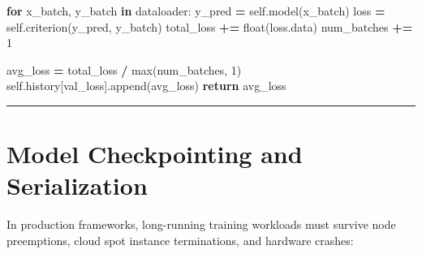 \documentclass[
  letterpaper,
]{scrbook}
\newenvironment{Shaded}{\begin{snugshade}}{\end{snugshade}}
\newcommand{\BuiltInTok}[1]{#1}
\newcommand{\ControlFlowTok}[1]{\textcolor[rgb]{0.13,0.29,0.53}{\textbf{#1}}}
\newcommand{\DecValTok}[1]{\textcolor[rgb]{0.00,0.00,0.81}{#1}}
\newcommand{\KeywordTok}[1]{\textcolor[rgb]{0.13,0.29,0.53}{\textbf{#1}}}
\newcommand{\NormalTok}[1]{#1}
\newcommand{\OperatorTok}[1]{\textcolor[rgb]{0.81,0.36,0.00}{\textbf{#1}}}
\newcommand{\StringTok}[1]{\textcolor[rgb]{0.31,0.60,0.02}{#1}}
\newcommand{\VariableTok}[1]{\textcolor[rgb]{0.00,0.00,0.00}{#1}}
\begin{document}
\begin{Shaded}
\begin{Highlighting}[]
        \ControlFlowTok{for}\NormalTok{ x\_batch, y\_batch }\KeywordTok{in}\NormalTok{ dataloader:}
\NormalTok{            y\_pred }\OperatorTok{=} \VariableTok{self}\NormalTok{.model(x\_batch)}
\NormalTok{            loss }\OperatorTok{=} \VariableTok{self}\NormalTok{.criterion(y\_pred, y\_batch)}
\NormalTok{            total\_loss }\OperatorTok{+=} \BuiltInTok{float}\NormalTok{(loss.data)}
\NormalTok{            num\_batches }\OperatorTok{+=} \DecValTok{1}

\NormalTok{        avg\_loss }\OperatorTok{=}\NormalTok{ total\_loss }\OperatorTok{/} \BuiltInTok{max}\NormalTok{(num\_batches, }\DecValTok{1}\NormalTok{)}
        \VariableTok{self}\NormalTok{.history[}\StringTok{\textquotesingle{}val\_loss\textquotesingle{}}\NormalTok{].append(avg\_loss)}
        \ControlFlowTok{return}\NormalTok{ avg\_loss}
\end{Highlighting}
\end{Shaded}

\begin{center}\rule{0.5\linewidth}{0.5pt}\end{center}

\section{Model Checkpointing and
Serialization}\label{model-checkpointing-and-serialization}

In production frameworks, long-running training workloads must survive
node preemptions, cloud spot instance terminations, and hardware
crashes:
\end{document}
